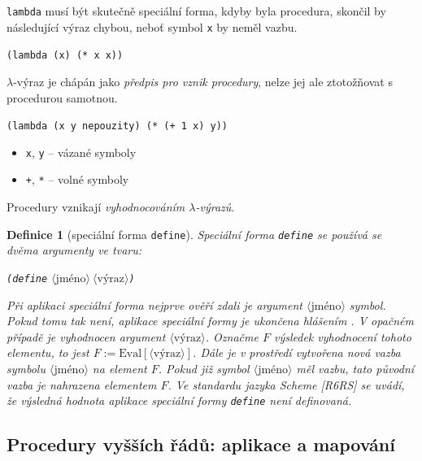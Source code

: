 \documentclass[10pt,a4paper]{article}
\newtheorem{definition}{Definice}
\begin{document}
    \texttt{lambda} musí být skutečně speciální forma, kdyby byla procedura, skončil by následující výraz chybou, neboť symbol \texttt{x} by neměl vazbu.
    
    \hspace{4ex} \texttt{(lambda (x) (* x x))}
    
    $\lambda$-výraz je chápán jako \textit{předpis pro vznik procedury}, nelze jej ale ztotožňovat s procedurou samotnou.
    
    \texttt{(lambda (x y nepouzity) (* (+ 1 x) y))}
    \begin{itemize}
      \item \texttt{x}, \texttt{y} -- vázané symboly
      \item \texttt{+}, \texttt{*} -- volné symboly
    \end{itemize}
    
    Procedury vznikají \textit{vyhodnocováním $\lambda$-výrazů}.
    
    \begin{definition}[speciální forma \texttt{define}] Speciální forma \texttt{define} se používá se dvěma argumenty ve tvaru:
    
      \hspace{4ex} \texttt{(define} $\langle\text{jméno}\rangle\ \langle\text{výraz}\rangle$\texttt{)}
      
      Při aplikaci speciální forma nejprve ověří zdali je argument $\langle\text{jméno}\rangle$ symbol. Pokud tomu tak není, aplikace speciální formy je ukončena hlášením . V opačném případě je vyhodnocen argument $\langle\text{výraz}\rangle$. Označme $F$ výsledek vyhodnocení tohoto elementu, to jest \mbox{$F:=\text{Eval}[\langle\text{výraz}\rangle]$}. Dále je v prostředí vytvořena nová vazba symbolu $\langle\text{jméno}\rangle$ na element $F$. Pokud již symbol $\langle\text{jméno}\rangle$ měl vazbu, tato původní vazba je nahrazena elementem $F$. Ve standardu jazyka Scheme [R6RS] se uvádí, že výsledná hodnota aplikace speciální formy \texttt{define} není definovaná.
    \end{definition}
    
  \subsection{Procedury vyšších řádů: aplikace a mapování}
\end{document}
